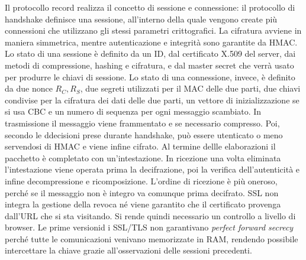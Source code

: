 \documentclass[answers, a4paper, 11pt]{exam}
\begin{document}
\begin{questions}
\begin{parts}
\begin{solution}
\begin{itemize}
Il protocollo record realizza il concetto di sessione e connessione: il protocollo di handshake definisce una sessione, all'interno della quale vengono create più connessioni che utilizzano gli stessi parametri crittografici.
La cifratura avviene in maniera simmetrica, mentre autenticazione e integrità sono garantite da HMAC.
Lo stato di una sessione è definito da un ID, dal certificato X.509 del server, dai metodi di compressione, hashing e cifratura, e dal master secret che verrà usato per produrre le chiavi di sessione. 
Lo stato di una connessione, invece, è definito da due nonce $R_C, R_S$, due segreti utilizzati per il MAC delle due parti, due chiavi condivise per la cifratura dei dati delle due parti, un vettore di inizializzazione se si usa CBC e un numero di sequenza per ogni  messaggio scambiato.
In trasmissione il messaggio viene frammentato e se necessario compresso.
Poi, secondo le ddecisioni prese durante handshake, può essere utenticato o meno servendosi di HMAC e viene infine cifrato.
Al termine dellle elaborazioni il pacchetto è completato con un'intestazione.
In ricezione una volta eliminata l'intestazione viene operata prima la decifrazione, poi la verifica dell'autenticità e infine decompressione e ricomposizione.
L'ordine di ricezione è più oneroso, perché se il messaggio non è integro va comunque prima decifrato.
SSL non integra la gestione della revoca né viene garantito che il certificato provenga dall'URL che si sta visitando.
Si rende quindi necessario un controllo a livello di browser.
	Le prime versionid i SSL/TLS non garantivano \textit{perfect forward secrecy} perché tutte le comunicazioni venivano memorizzate in RAM, rendendo possibile intercettare la chiave grazie all'osservazioni delle sessioni precedenti.


\end{itemize}
\end{solution}
\end{parts}
\end{questions}
\end{document}
